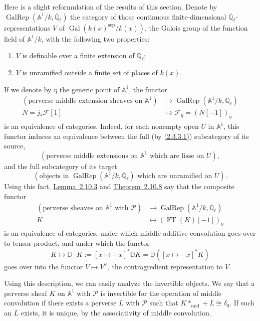 Here is a slight reformulation of the results of this section. Denote by
\(\operatorname{GalRep}(\mathbb{A}^1/k,\overline{\mathbb{Q}}_\ell)\) the
category of those continuous finite-dimensional
\(\overline{\mathbb{Q}}_\ell\)-representations \(V\) of
\(\operatorname{Gal}(k(x)^{\mathrm{sep}}/k(x))\), the Galois group of the
function field of \(\mathbb{A}^1/k\), with the following two properties:
\begin{enumerate}[label=(\arabic*)]
\item \(V\) is definable over a finite extension of \(\mathbb{Q}_\ell\);
\item \(V\) is unramified outside a finite set of places of \(k(x)\).
\end{enumerate}
If we denote by \(\eta\) the generic point of \(\mathbb{A}^1\), the functor
\[
  \begin{aligned}
  (\text{perverse middle extension sheaves on }\mathbb{A}^1)
    &\to \operatorname{GalRep}(\mathbb{A}^1/k,\overline{\mathbb{Q}}_\ell)\\
  N=j_*\mathcal{F}[1]&\mapsto \mathcal{F}_\eta=(N[-1])_\eta
  \end{aligned}
\]
is an equivalence of categories. Indeed, for each nonempty open \(U\) in
\(\mathbb{A}^1\), this functor induces an equivalence between the full
(by \hyperref[par:2.3.3.1]{(2.3.3.1)}) subcategory of its source,
\[
  (\text{perverse middle extensions on }\mathbb{A}^1\text{ which are lisse on }U),
\]
and the full subcategory of its target
\[
  (\text{objects in }\operatorname{GalRep}(\mathbb{A}^1/k,\overline{\mathbb{Q}}_\ell)
  \text{ which are unramified on }U).
\]
Using this fact, \hyperref[lem:2.10.3]{Lemma~2.10.3} and
\hyperref[thm:2.10.8]{Theorem~2.10.8} say that the composite functor
\[
  \begin{aligned}
  (\text{perverse sheaves on }\mathbb{A}^1\text{ with }\mathcal{P})
    &\to \operatorname{GalRep}(\mathbb{A}^1/k,\overline{\mathbb{Q}}_\ell)\\
  K&\mapsto (\operatorname{FT}(K)[-1])_\eta
  \end{aligned}
\]
is an equivalence of categories, under which middle additive convolution goes
over to tensor product, and under which the functor
\[
  K\mapsto \mathbb{D}_{-}K:=[x\mapsto -x]^*\mathbb{D}K
  =\mathbb{D}([x\mapsto -x]^*K)
\]
goes over into the functor \(V\mapsto V^\vee\), the contragredient
representation to \(V\).

Using this description, we can easily analyze the invertible objects. We say
that a perverse sheaf \(K\) on \(\mathbb{A}^1\) with \(\mathcal{P}\) is
invertible for the operation of middle convolution if there exists a perverse
\(L\) with \(\mathcal{P}\) such that \(K*_{\mathrm{mid}}+L\cong\delta_0\). If
such an \(L\) exists, it is unique, by the associativity of middle convolution.

